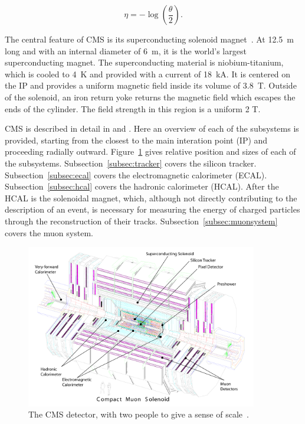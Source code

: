 \begin{equation}
\eta = -\log\left(\frac{\theta}{2}\right) .
\end{equation}

The central feature of CMS is its superconducting solenoid magnet~\cite{cms:solenoid}.
At 12.5~m long and with an internal diameter of 6~m, it is the world's largest superconducting magnet.
The superconducting material is niobium-titanium, which is cooled to 4~K and provided with a current
of 18~kA.
It is centered on the IP and provides a uniform magnetic field inside its volume of 3.8~T.
Outside of the solenoid, an iron return yoke returns the magnetic field which escapes the ends
of the cylinder. The field strength in this region is a uniform 2 T.

CMS is described in detail in \cite{Chatrchyan:2008zzk} and \cite{Bayatian:922757}.
Here an overview of each of the subsystems
is provided, starting from the closest to the main interation point (IP) and proceeding
radially outward. Figure~\ref{fig:CMS_side} gives relative position and sizes of each of the
subsystems.
Subsection~\ref{subsec:tracker} covers the silicon tracker. Subsection~\ref{subsec:ecal} covers the
electromagnetic calorimeter (ECAL). Subsection~\ref{subsec:hcal} covers the hadronic calorimeter
(HCAL). After the HCAL is the solenoidal magnet, which, although not directly contributing to the
description of an event, is necessary for measuring the energy of charged particles through
the reconstruction of their tracks. Subsection~\ref{subsec:muonsystem} covers the muon system.

\begin{figure}[ht]
 \begin{center}
   \includegraphics[width=0.90\textwidth]{figures/experiment/cms_complete_labelled.pdf}
      \end{center}
\caption{The CMS detector, with two people to give a sense of scale~\cite{Collaboration:1433717}.}
\label{fig:CMS_side}
\end{figure}

